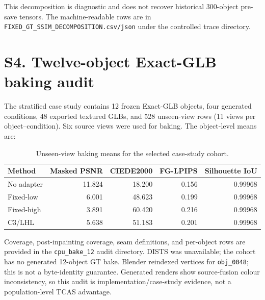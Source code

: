 \documentclass[10pt]{article}
\begin{document}
This decomposition is diagnostic and does not recover historical 300-object
pre-save tensors. The machine-readable rows are in
\texttt{FIXED\_GT\_SSIM\_DECOMPOSITION.csv/json} under the controlled trace
directory.

\section{S4. Twelve-object Exact-GLB baking audit}

The stratified case study contains 12 frozen Exact-GLB objects, four generated
conditions, 48 exported textured GLBs, and 528 unseen-view rows (11 views per
object--condition). Six source views were used for baking. The object-level
means are:

\begin{table}[h]
\centering\small
\caption{Unseen-view baking means for the selected case-study cohort.}
\begin{tabular}{lrrrr}
\toprule
Method & Masked PSNR & CIEDE2000 & FG-LPIPS & Silhouette IoU \\
\midrule
No adapter & 11.824 & 18.200 & 0.156 & 0.99968 \\
Fixed-low & 6.001 & 48.623 & 0.199 & 0.99968 \\
Fixed-high & 3.891 & 60.420 & 0.216 & 0.99968 \\
C3/LHL & 5.638 & 51.183 & 0.201 & 0.99968 \\
\bottomrule
\end{tabular}
\end{table}

Coverage, post-inpainting coverage, seam definitions, and per-object rows are
provided in the \texttt{cpu\_bake\_12} audit directory. DISTS was
unavailable; the cohort has no generated 12-object GT bake. Blender reindexed
vertices for \texttt{obj\_0048}; this is not a byte-identity guarantee.
Generated renders show source-fusion colour inconsistency, so this audit is
implementation/case-study evidence, not a population-level TCAS advantage.

\begin{table}[h]
\centering\scriptsize
\caption{Concrete object-level baking failure boundaries. Values are
object means over 11 unseen views; paired entries are fixed-low/C3.}
\end{table}
\end{document}
